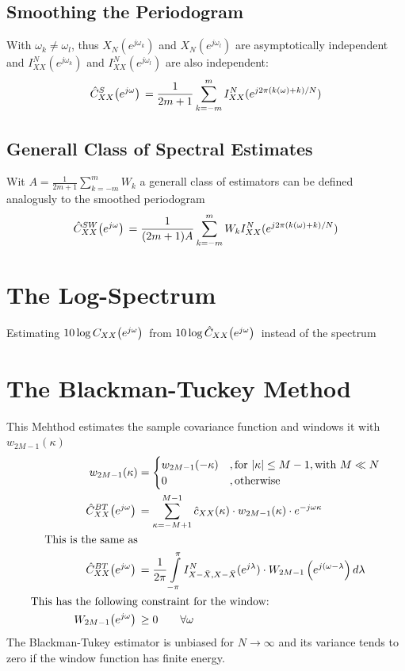 \documentclass[accentcolor=tud4c,9.5pt,nochapname,bigchapter,paper=a5report]{tudreport}
\begin{document}
\subsection{Smoothing the Periodogram}
With $\omega_k\neq\omega_l$, thus $X_N(e^{j\omega_k})$ and $X_N(e^{j\omega_l})$ are asymptotically independent and 
$I_{XX}^N(e^{j\omega_k})$ and $I_{XX}^N(e^{j\omega_l})$ are also independent:
\begin{equation}
\hat{C}_{XX}^S{\left(e^{j\omega}\right)}\, = \frac{1}{2m+1}\sum\limits_{k=-m}^m I_{XX}^N(e^{j2\pi(k(\omega)+k)/N})
\end{equation}


\subsection{Generall Class of Spectral Estimates}
Wit $A=\frac{1}{2m+1}\sum_{k=-m}^m W_k$ a generall class of estimators can be defined analogusly to the smoothed periodogram
\begin{equation}
\hat{C}_{XX}^{SW}{\left(e^{j\omega}\right)}\, = \frac{1}{(2m+1)A}\sum\limits_{k=-m}^m W_kI_{XX}^N(e^{j2\pi(k(\omega)+k)/N})
\end{equation}

\section{The Log-Spectrum}
Estimating $10\log C_{XX}{\left(e^{j\omega}\right)}\,$ from $10\log \hat{C}_{XX}{\left(e^{j\omega}\right)}\,$ instead of the spectrum
\section{The Blackman-Tuckey Method}
This Mehthod estimates the sample covariance function and windows it with $w_{2M-1}(\kappa)$
\begin{subequations}
\begin{align}
w_{2M-1}(\kappa) &= \begin{cases}
w_{2M-1}(-\kappa) &,\text{for } |\kappa|\leq M-1 ,\text{with } M\ll N\\
0 &,\text{otherwise}\end{cases}\\
\hat{C}_{XX}^{BT}{\left(e^{j\omega}\right)}\, &= \sum\limits_{\kappa=-M+1}^{M-1} \hat{c}_{XX}(\kappa )\cdot w_{2M-1}(\kappa)\cdot e^{-j\omega\kappa}\\
\text{This is the same as} \notag\\
\hat{C}_{XX}^{BT}{\left(e^{j\omega}\right)}\, &= \frac{1}{2\pi} \int\limits_{-\pi}^\pi I_{X-\bar{X},X-\bar{X}}^N(e^{j\lambda})\cdot W_{2M-1}\left(e^{j(\omega-\lambda}\right)d\lambda\\
\text{This has the following}&\text{ constraint for the window:} \notag\\
W_{2M-1}{\left(e^{j\omega}\right)}\, &\geq 0 \quad\quad \forall \omega
\end{align}
\end{subequations}
The Blackman-Tukey estimator is unbiased for $N\rightarrow\infty$ and its variance tends to zero if the window function has finite energy.
\end{document}
